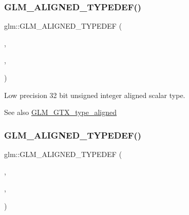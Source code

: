 \subsubsection{\texorpdfstring{G\+L\+M\+\_\+\+A\+L\+I\+G\+N\+E\+D\+\_\+\+T\+Y\+P\+E\+D\+E\+F()}{GLM\_ALIGNED\_TYPEDEF()}\hspace{0.1cm}{\footnotesize\ttfamily [79/209]}}
{\footnotesize\ttfamily glm\+::\+G\+L\+M\+\_\+\+A\+L\+I\+G\+N\+E\+D\+\_\+\+T\+Y\+P\+E\+D\+EF (\begin{DoxyParamCaption}\item[{\hyperlink{group__gtc__type__precision_gaba06fae1dd98ca50c017e68345df0365}{lowp\+\_\+u32}}]{,  }\item[{aligned\+\_\+lowp\+\_\+u32}]{,  }\item[{4}]{ }\end{DoxyParamCaption})}

Low precision 32 bit unsigned integer aligned scalar type. \begin{DoxySeeAlso}{See also}
\hyperlink{group__gtx__type__aligned}{G\+L\+M\+\_\+\+G\+T\+X\+\_\+type\+\_\+aligned} 
\end{DoxySeeAlso}
\mbox{\label{group__gtx__type__aligned_gacca5f13627f57b3505676e40a6e43e5e}} 
\subsubsection{\texorpdfstring{G\+L\+M\+\_\+\+A\+L\+I\+G\+N\+E\+D\+\_\+\+T\+Y\+P\+E\+D\+E\+F()}{GLM\_ALIGNED\_TYPEDEF()}\hspace{0.1cm}{\footnotesize\ttfamily [80/209]}}
{\footnotesize\ttfamily glm\+::\+G\+L\+M\+\_\+\+A\+L\+I\+G\+N\+E\+D\+\_\+\+T\+Y\+P\+E\+D\+EF (\begin{DoxyParamCaption}\item[{\hyperlink{group__gtc__type__precision_ga61ed4c68a4cffb77cd63cc107119123a}{lowp\+\_\+u64}}]{,  }\item[{aligned\+\_\+lowp\+\_\+u64}]{,  }\item[{8}]{ }\end{DoxyParamCaption})}

